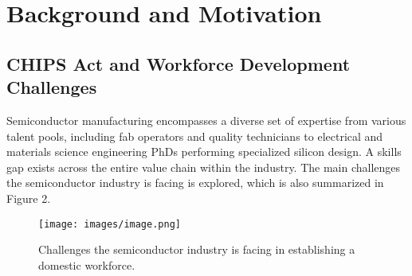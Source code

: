 \section{Background and Motivation}\label{sec2:motivation}
\subsection{CHIPS Act and Workforce Development Challenges}\label{sec2_1:challenges_of_chips_act}
Semiconductor manufacturing encompasses a diverse set of expertise from various talent pools, including fab operators and quality technicians to electrical and materials science engineering PhDs performing specialized silicon design. A skills gap exists across the entire value chain within the industry. The main challenges the semiconductor industry is facing is explored, which is also summarized in Figure 2.

\begin{figure*}
    \centering
    \texttt{[image: images/image.png]}
    \caption{Challenges the semiconductor industry is facing in establishing a domestic workforce.}
    \label{fig:2}
\end{figure*}


